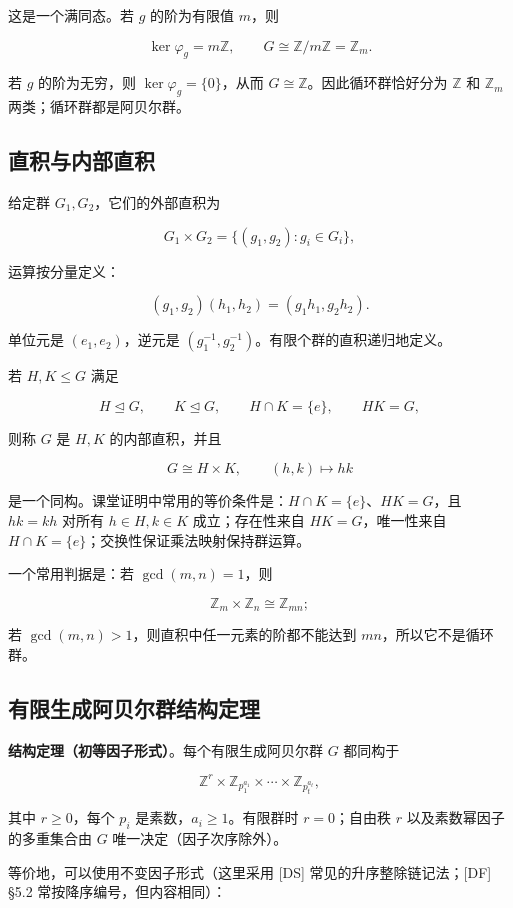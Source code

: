 这是一个满同态。若 $g$ 的阶为有限值 $m$，则

\[
\ker\varphi_g=m\mathbb Z,
\qquad G\cong\mathbb Z/m\mathbb Z=\mathbb Z_m.
\]

若 $g$ 的阶为无穷，则 $\ker\varphi_g=\{0\}$，从而 $G\cong\mathbb Z$。因此循环群恰好分为 $\mathbb Z$ 和 $\mathbb Z_m$ 两类；循环群都是阿贝尔群。

\subsection{直积与内部直积}


给定群 $G_1,G_2$，它们的外部直积为

\[
G_1\times G_2=\{(g_1,g_2):g_i\in G_i\},
\]

运算按分量定义：

\[
(g_1,g_2)(h_1,h_2)=(g_1h_1,g_2h_2).
\]

单位元是 $(e_1,e_2)$，逆元是 $(g_1^{-1},g_2^{-1})$。有限个群的直积递归地定义。

若 $H,K\le G$ 满足

\[
H\trianglelefteq G,\qquad K\trianglelefteq G,\qquad H\cap K=\{e\},\qquad HK=G,
\]

则称 $G$ 是 $H,K$ 的内部直积，并且

\[
G\cong H\times K,
\qquad (h,k)\longmapsto hk
\]

是一个同构。课堂证明中常用的等价条件是：$H\cap K=\{e\}$、$HK=G$，且 $hk=kh$ 对所有 $h\in H,k\in K$ 成立；存在性来自 $HK=G$，唯一性来自 $H\cap K=\{e\}$；交换性保证乘法映射保持群运算。

一个常用判据是：若 $\gcd(m,n)=1$，则

\[
\mathbb Z_m\times\mathbb Z_n\cong\mathbb Z_{mn};
\]

若 $\gcd(m,n)>1$，则直积中任一元素的阶都不能达到 $mn$，所以它不是循环群。

\subsection{有限生成阿贝尔群结构定理}


\textbf{结构定理（初等因子形式）}。每个有限生成阿贝尔群 $G$ 都同构于

\[
\mathbb Z^r\times
\mathbb Z_{p_1^{a_1}}\times\cdots\times
\mathbb Z_{p_t^{a_t}},
\]

其中 $r\ge 0$，每个 $p_i$ 是素数，$a_i\ge 1$。有限群时 $r=0$；自由秩 $r$ 以及素数幂因子的多重集合由 $G$ 唯一决定（因子次序除外）。

等价地，可以使用不变因子形式（这里采用 [DS] 常见的升序整除链记法；[DF] §5.2 常按降序编号，但内容相同）：

